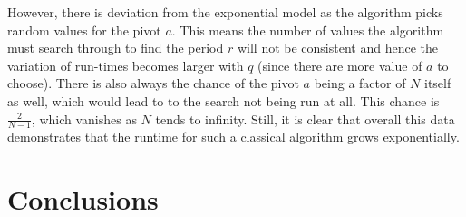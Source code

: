 \documentclass{article}[11pt]
\begin{document}
However, there is deviation from the exponential model as the algorithm picks random values for the pivot $a$. This means the number of values the algorithm must search through to find the period $r$ will not be consistent and hence the variation of run-times becomes larger with $q$ (since there are more value of $a$ to choose). There is also always the chance of the pivot $a$ being a factor of $N$ itself as well, which would lead to to the search not being run at all. This chance is $\frac{2}{N-1}$, which vanishes as $N$ tends to infinity. Still, it is clear that overall this data demonstrates that the runtime for such a classical algorithm grows exponentially. %


\pagebreak
\section{Conclusions}
\end{document}
